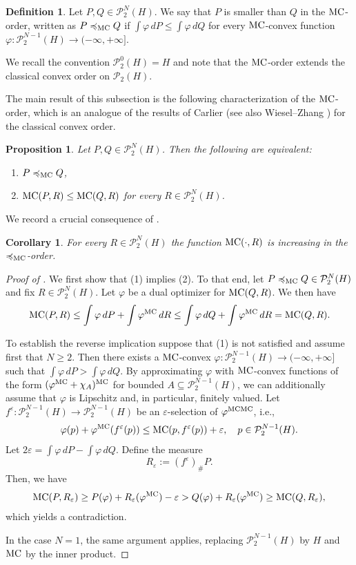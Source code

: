 \documentclass[a4paper]{amsart}
\numberwithin{theorem}{section}
\newtheorem{proposition}[theorem]{Proposition}
\newtheorem{corollary}[theorem]{Corollary}
\theoremstyle{definition}
\newtheorem{definition}[theorem]{Definition}
\newcommand{\Pc}{\mathcal P}
\renewcommand{\epsilon}{\varepsilon}
\renewcommand{\H}{H}
\renewcommand{\phi}{\varphi}
\newcommand{\mc}{\textup{MC}}
\newcommand{\MC}{\textup{MC}}
\newcommand{\lemc}{\preccurlyeq_\mc}
\begin{document}
\begin{definition}\label{def:MCorder}
Let $P,Q \in \Pc_2^N(\H)$. We say that $P$ is smaller than $Q$ in the $\mc$-order, written as $P \lemc Q$ if $\int \phi \,  d P \le \int \phi \, dQ$ for every $\mc$-convex function $\phi : \Pc_2^{N-1}(\H) \to (-\infty,+\infty]$. 
\end{definition}
We recall the convention $\Pc_2^0(\H)=\H$ and note that the $\mc$-order extends the classical convex order on $\Pc_2(H)$.

 The main result of this subsection is the following characterization of the $\mc$-order, which is an analogue of the results of Carlier \cite{Ca08} (see also Wiesel--Zhang \cite{WiZh22}) for the classical convex order.

\begin{proposition}\label{prop:MC_order:_char}
Let $P,Q \in \Pc_2^N(\H)$. Then the following are equivalent:
\begin{enumerate}
    \item $P \lemc Q$,
    \item $\mc(P,R) \le \mc(Q,R)$ for every $R \in \Pc_2^N(\H)$. 
\end{enumerate}
\end{proposition}
We record a crucial consequence of .
\begin{corollary}\label{cor:MCincrMC}
For every $R \in \Pc_2^N(\H)$ the function $\mc(\cdot,R)$ is increasing in the $\lemc$-order.    
\end{corollary}



\begin{proof}[Proof of  ]
We first show that (1) implies (2). To that end, let $P \lemc Q \in \Pc_2^N(\H)$ and fix $R \in \Pc_2^N(\H)$. Let $\phi$ be a dual optimizer for $\mc(Q,R)$. We then have 
\[
\mc(P,R) \le \int \phi \,dP + \int \phi^{\mc} \, dR \le \int \phi \,dQ + \int \phi^{\mc} \, dR = \mc(Q,R).
\]

To establish the reverse implication suppose that (1) is not satisfied and assume first that $N\geq 2$. Then there exists a $\mc$-convex $\phi : \Pc_2^{N-1}(\H) \to (-\infty, +\infty]$ such that $\int \phi \, dP > \int \phi \, dQ$.
By approximating $\phi$ with $\mc$-convex functions of the form $(\phi^\mc + \chi_A)^\mc$ for bounded $A \subseteq \Pc^{N-1}_2(\H)$, we can additionally assume that $\phi$ is Lipschitz and, in particular, finitely valued.
Let $f^\epsilon : \Pc^{N-1}_2(\H) \to \Pc^{N-1}_2(\H)$ be an $\epsilon$-selection of $\phi^{\mc\mc}$, i.e.,
\[
    \phi(p) + \phi^\mc(f^\epsilon(p)) \le \mc(p,f^\epsilon(p)) + \epsilon, \quad p \in \Pc^{N-1}_2(\H).
\]
Let $2 \epsilon = \int \phi \, dP - \int \phi \, dQ$.
Define the measure
\[
    R_\epsilon := (f^\epsilon)_\# P.
\]
Then, we have
\begin{align*}
    \MC(P,R_\epsilon) \ge P(\phi) + R_\epsilon(\phi^\mc) - \epsilon > Q(\phi) + R_\epsilon(\phi^\mc) \ge \MC(Q,R_\epsilon),
\end{align*}
which yields a contradiction.

In the case $N=1$, the same argument applies, replacing $\Pc^{N-1}_2(\H)$ by $H$ and $\mc$ by the inner product.
\end{proof}
\end{document}
